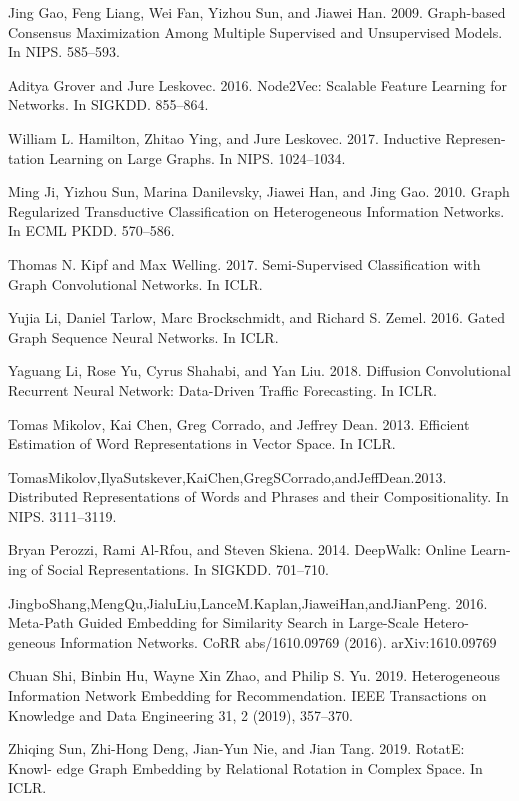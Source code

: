 \documentclass[conference]{IEEEtran}
\theoremstyle{theoremst}
\begin{document}
\begin{thebibliography}{00}
 Jing Gao, Feng Liang, Wei Fan, Yizhou Sun, and Jiawei Han. 2009. Graph-based Consensus Maximization Among Multiple Supervised and Unsupervised Models. In NIPS. 585–593.

 Aditya Grover and Jure Leskovec. 2016. Node2Vec: Scalable Feature Learning for Networks. In SIGKDD. 855–864.

 William L. Hamilton, Zhitao Ying, and Jure Leskovec. 2017. Inductive Represen- tation Learning on Large Graphs. In NIPS. 1024–1034.

 Ming Ji, Yizhou Sun, Marina Danilevsky, Jiawei Han, and Jing Gao. 2010. Graph Regularized Transductive Classification on Heterogeneous Information Networks. In ECML PKDD. 570–586.

 Thomas N. Kipf and Max Welling. 2017. Semi-Supervised Classification with Graph Convolutional Networks. In ICLR.

 Yujia Li, Daniel Tarlow, Marc Brockschmidt, and Richard S. Zemel. 2016. Gated Graph Sequence Neural Networks. In ICLR.

 Yaguang Li, Rose Yu, Cyrus Shahabi, and Yan Liu. 2018. Diffusion Convolutional Recurrent Neural Network: Data-Driven Traffic Forecasting. In ICLR.

 Tomas Mikolov, Kai Chen, Greg Corrado, and Jeffrey Dean. 2013. Efficient Estimation of Word Representations in Vector Space. In ICLR.

 TomasMikolov,IlyaSutskever,KaiChen,GregSCorrado,andJeffDean.2013. Distributed Representations of Words and Phrases and their Compositionality. In NIPS. 3111–3119.

 Bryan Perozzi, Rami Al-Rfou, and Steven Skiena. 2014. DeepWalk: Online Learn- ing of Social Representations. In SIGKDD. 701–710.

 JingboShang,MengQu,JialuLiu,LanceM.Kaplan,JiaweiHan,andJianPeng. 2016. Meta-Path Guided Embedding for Similarity Search in Large-Scale Hetero- geneous Information Networks. CoRR abs/1610.09769 (2016). arXiv:1610.09769

 Chuan Shi, Binbin Hu, Wayne Xin Zhao, and Philip S. Yu. 2019. Heterogeneous Information Network Embedding for Recommendation. IEEE Transactions on Knowledge and Data Engineering 31, 2 (2019), 357–370.

 Zhiqing Sun, Zhi-Hong Deng, Jian-Yun Nie, and Jian Tang. 2019. RotatE: Knowl- edge Graph Embedding by Relational Rotation in Complex Space. In ICLR.


\end{thebibliography}
\end{document}
